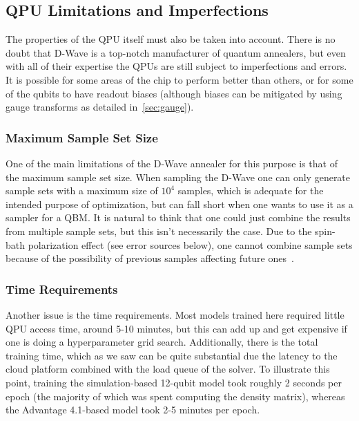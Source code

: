 \subsection{QPU Limitations and Imperfections}
The properties of the QPU itself must also be taken into account.
There is no doubt that D-Wave is a top-notch manufacturer of quantum annealers, but even with all of their expertise the QPUs are still subject to imperfections and errors.
It is possible for some areas of the chip to perform better than others, or for some of the qubits to have readout biases (although biases can be mitigated by using gauge transforms as detailed in~\cref{sec:gauge}).

\subsubsection{Maximum Sample Set Size}
One of the main limitations of the D-Wave annealer for this purpose is that of the maximum sample set size.
When sampling the D-Wave one can only generate sample sets with a maximum size of \( 10^4 \) samples, which is adequate for the intended purpose of optimization, but can fall short when one wants to use it as a sampler for a QBM.
It is natural to think that one could just combine the results from multiple sample sets, but this isn't necessarily the case.
Due to the spin-bath polarization effect (see error sources below), one cannot combine sample sets because of the possibility of previous samples affecting future ones~\cite{pochart_2021}.

\subsubsection{Time Requirements}
Another issue is the time requirements.
Most models trained here required little QPU access time, around 5-10 minutes, but this can add up and get expensive if one is doing a hyperparameter grid search.
Additionally, there is the total training time, which as we saw can be quite substantial due the latency to the cloud platform combined with the load queue of the solver.
To illustrate this point, training the simulation-based 12-qubit model took roughly 2 seconds per epoch (the majority of which was spent computing the density matrix), whereas the Advantage 4.1-based model took 2-5 minutes per epoch.

